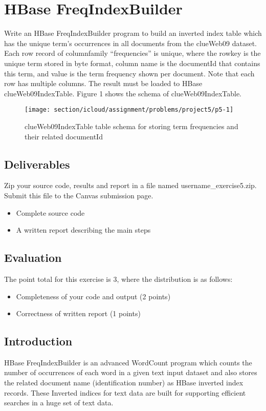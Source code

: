 \section*{HBase FreqIndexBuilder}

Write an HBase FreqIndexBuilder program to build an inverted index table which
has the unique term's occurrences in all documents from the clueWeb09 dataset.
Each row record of columnfamily ``frequencies'' is unique, where the rowkey is
the unique term stored in byte format, column name is the documentId that
contains this term, and value is the term frequency shown per document. Note
that each row has multiple columns. The result must be loaded to HBase
clueWeb09IndexTable. Figure 1 shows the schema of clueWeb09IndexTable.

\begin{figure}[!htbp]
\texttt{[image: section/icloud/assignment/problems/project5/p5-1]}
\centering
\caption{clueWeb09IndexTable table schema for storing term frequencies and their related documentId}
\end{figure}

\subsection*{Deliverables}
Zip your source code, results and report in a file named
username\_exercise5.zip. Submit this file to the Canvas submission page.

\begin{itemize}
\item Complete source code
\item A written report describing the main steps
\end{itemize}

\subsection*{Evaluation}
The point total for this exercise is 3, where the distribution is as follows:
\begin{itemize}
\item Completeness of your code and output (2 points)
\item Correctness of written report (1 points)
\end{itemize}

\subsection*{Introduction}
HBase FreqIndexBuilder is an advanced WordCount program which counts the number
of occurrences of each word in a given text input dataset and also stores the
related document name (identification number) as HBase inverted index records.
These Inverted indices for text data are built for supporting efficient
searches in a huge set of text data.

